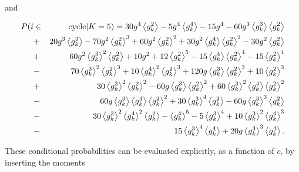 \documentclass[preprint,pre,superscriptaddress,showpacs]{revtex4}
\begin{document}
\noindent
and

\begin{eqnarray}
P(i&\in&{\rm cycle} | K=5)
=
30 g^4 \left\langle g_k^2\right\rangle -5 g^4 
\left\langle g_k^4\right\rangle -15 g^4-60 g^3   
\left\langle g_k^3\right\rangle  \left\langle g_k^2\right\rangle  
\nonumber \\
&+&20 g^3 \left\langle   g_k^3\right\rangle
-70 g^2 \left\langle g_k^2\right\rangle^3+60 g^2 \left\langle   
g_k^2\right\rangle^2+30 g^2 \left\langle g_k^4\right\rangle  
\left\langle g_k^2\right\rangle^2 
-30 g^2 \left\langle g_k^2\right\rangle
\nonumber \\
&+&60 g^2 \left\langle g_k^3\right\rangle^2 
\left\langle g_k^2\right\rangle +10 g^2+12 
\left\langle g_k^2\right\rangle^5-15 
\left\langle g_k^4\right\rangle  \left\langle g_k^2\right\rangle^4
-15 \left\langle g_k^2\right\rangle^4
\nonumber \\
&-&70 \left\langle g_k^3\right\rangle^2 
\left\langle g_k^2\right\rangle^3+10 
\left\langle g_k^4\right\rangle^2 
\left\langle g_k^2\right\rangle^3
+120 g \left\langle g_k^3\right\rangle  
\left\langle g_k^2\right\rangle^3
+10  \left\langle g_k^2\right\rangle^3
\nonumber \\
&+&30 \left\langle g_k^3\right\rangle^2 
\left\langle g_k^2\right\rangle^2
-60 g \left\langle g_k^3\right\rangle  
\left\langle g_k^2\right\rangle^2+60 
\left\langle g_k^3\right\rangle^2 
\left\langle g_k^4\right\rangle  
\left\langle g_k^2\right\rangle^2
\nonumber \\
&-&60 g \left\langle g_k^3\right\rangle  
\left\langle g_k^4\right\rangle  
\left\langle g_k^2\right\rangle^2
+30 \left\langle g_k^3\right\rangle^4 
\left\langle g_k^2\right\rangle 
-60 g\left\langle g_k^3\right\rangle^3 
\left\langle g_k^2\right\rangle  
\nonumber \\
&-&30 \left\langle  g_k^3\right\rangle^2 
\left\langle g_k^4\right\rangle^2 
\left\langle g_k^2\right\rangle
-\left\langle g_k^4\right\rangle^5-5 
\left\langle g_k^3\right\rangle^4+10 
\left\langle g_k^3\right\rangle^2 
\left\langle g_k^4\right\rangle^3
\nonumber \\
&-&15 \left\langle g_k^3\right\rangle^4 
\left\langle g_k^4\right\rangle +20 g 
\left\langle g_k^3\right\rangle^3 
\left\langle g_k^4\right\rangle.
\label{eq:icyc5}
\end{eqnarray}

\noindent
These conditional probabilities can be evaluated 
explicitly,
as a function of $c$,
by inserting the moments
\end{document}
